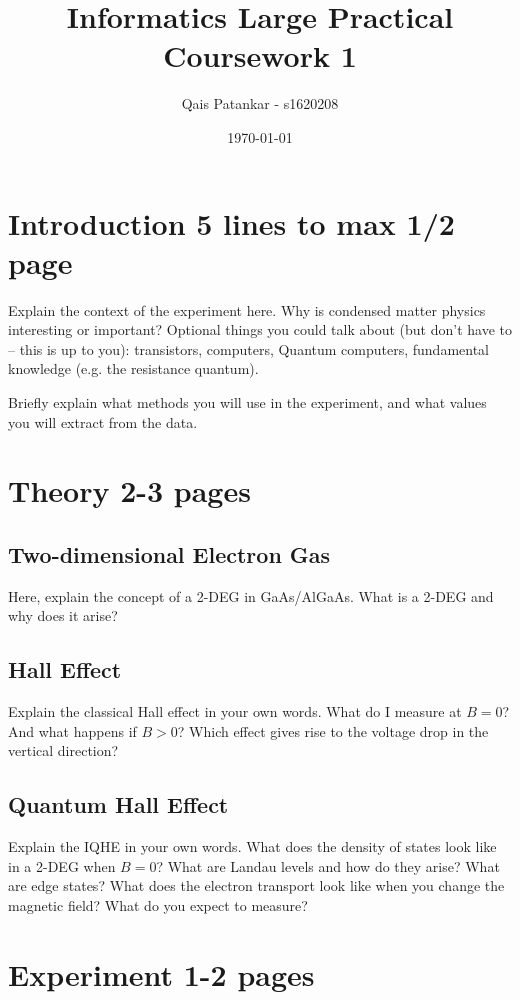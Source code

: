 \documentclass[a4paper]{article}
\title{Informatics Large Practical \\ \large{Coursework 1}}
\author{Qais Patankar - s1620208}
\date{\today}
\begin{document}
      \maketitle
      
      \section{Introduction 5 lines to max 1/2 page}
      \label{sec:introduction}
      
      Explain the context of the experiment here. Why is condensed matter physics interesting or important?
      Optional things you could talk about (but don't have to -- this is up to you): transistors, computers, Quantum computers, fundamental knowledge (e.g. the resistance quantum).
      
      Briefly explain what methods you will use in the experiment, and what values you will extract from the data.
      
      \section{Theory 2-3 pages}
      \label{sec:theory}
      
      \subsection{Two-dimensional Electron Gas}
      Here, explain the concept of a 2-DEG in GaAs/AlGaAs. What is a 2-DEG and why does it arise?
      
      \subsection{Hall Effect}
      Explain the classical Hall effect in your own words. What do I measure at $B=0$? And what happens if $B>0$? Which effect gives rise to the voltage drop in the vertical direction?
      
      \subsection{Quantum Hall Effect}
      Explain the IQHE in your own words. What does the density of states look like in a 2-DEG when $B=0$? What are Landau levels and how do they arise? What are edge states? What does the electron transport look like when you change the magnetic field? What do you expect to measure?
      
      \section{Experiment 1-2 pages}
\end{document}
